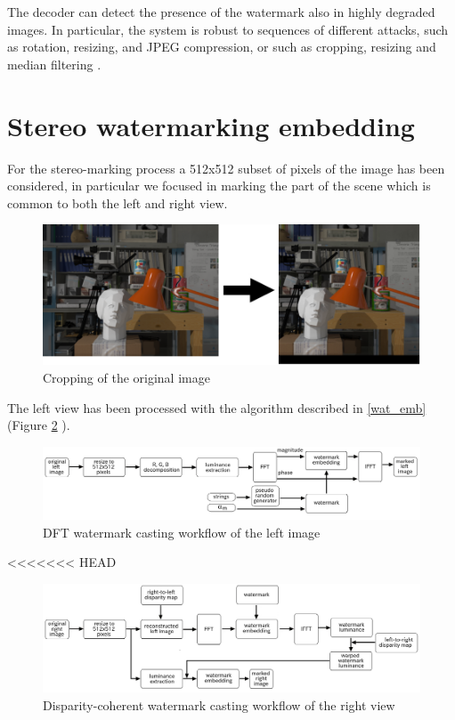 The decoder can detect the presence of the watermark also in highly degraded images. In particular, the system is robust to sequences of different attacks, such as rotation, resizing, and JPEG compression, or such as cropping, resizing and median filtering \cite{PIVA}.

\section{Stereo watermarking embedding}

For the stereo-marking process a 512x512 subset of pixels of the image has been considered, in particular we focused in marking the part of the scene which is common to both the left and right view.

\begin{figure}[h!]
\centering
\includegraphics[width=1\textwidth]{./img/cropping.png}
\caption{\small{Cropping of the original image}}
\label{fig:cropped}
\end{figure}

The left view has been processed with the algorithm described in \ref{wat_emb} (Figure \ref{fig:left_wat} ).\newline 


\begin{figure}[h!]
\centering
\includegraphics[width=1\textwidth]{./img/left_wat.png}
\caption{\small{DFT watermark casting workflow of the left image}\label{fig:left_wat}}

\end{figure}

<<<<<<< HEAD
\begin{figure}[h!]
\centering
\includegraphics[width=1\textwidth]{./img/pros.png}
\caption{\small{Disparity-coherent watermark casting workflow of the right view}}
\label{fig:right_wat}
\end{figure}



